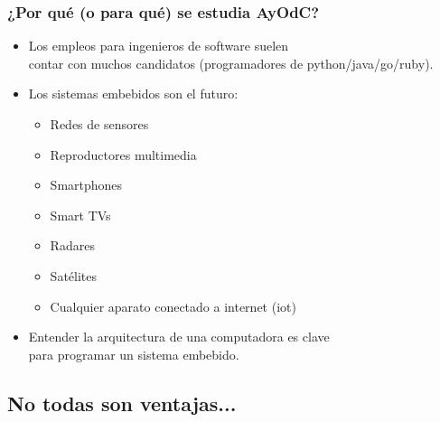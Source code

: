 \documentclass[aspectratio=169,compress]{beamer}
\begin{document}
\begin{frame}[fragile]
  \frametitle{¿Por qué (o para qué) se estudia AyOdC?}

\begin{small}
\begin{itemize}
\item Los empleos para ingenieros de software suelen \\ contar 
con muchos candidatos (programadores de python/java/go/ruby).

\item Los sistemas embebidos son el futuro:
\begin{itemize}
\item Redes de sensores
\item Reproductores multimedia
\item Smartphones
\item Smart TVs
\item Radares
\item Satélites
\item Cualquier aparato conectado a internet (iot)
\end{itemize}

\item Entender la arquitectura de una computadora es clave \\ para programar un sistema embebido.

\end{itemize}
\end{small}

\end{frame}




\subsection{No todas son ventajas...}
\end{document}
